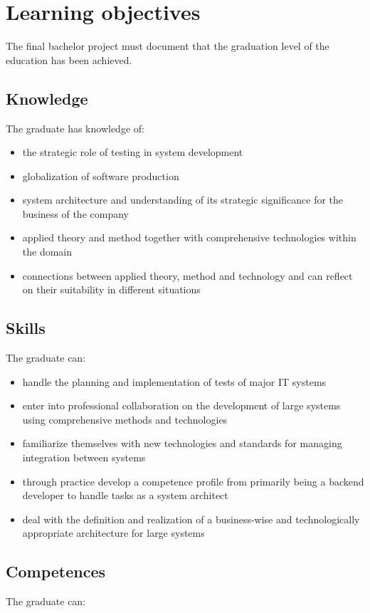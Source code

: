 \documentclass[12pt]{article}
\begin{document}
\section{Learning objectives}
The final bachelor project must document that the graduation level of the education has been achieved.

\subsection{Knowledge}
The graduate has knowledge of:

\begin{itemize}
\item the strategic role of testing in system development
\item globalization of software production
\item system architecture and understanding of its strategic significance for the business of the company
\item applied theory and method together with comprehensive technologies within the domain
\item connections between applied theory, method and technology and can reflect on their suitability in different situations
\end{itemize}

\subsection{Skills}
The graduate can:

\begin{itemize}
    \item handle the planning and implementation of tests of major IT systems
    \item enter into professional collaboration on the development of large systems using comprehensive methods and technologies
    \item familiarize themselves with new technologies and standards for managing integration between systems
    \item through practice develop a competence profile from primarily being a backend developer to handle tasks as a system architect
    \item deal with the definition and realization of a business-wise and technologically appropriate architecture for large systems
\end{itemize}

\subsection{Competences}
The graduate can:
\end{document}
